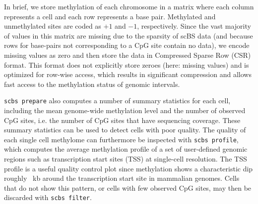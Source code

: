 \documentclass[twocolumn,10pt]{article}
\begin{document}
In brief, we store methylation of each chromosome in a matrix where each column represents a cell and each row represents a base pair.
Methylated and unmethylated sites are coded as $+1$ and $-1$, respectively.
Since the vast majority of values in this matrix are missing due to the sparsity of scBS data (and because rows for base-pairs not corresponding to a CpG site contain no data), we encode missing values as zero and then store the data in Compressed Sparse Row (CSR) format.
This format does not explicitly store zeroes (here: missing values) and is optimized for row-wise access, which results in significant compression and allows fast access to the methylation status of genomic intervals.

\texttt{scbs prepare} also computes a number of summary statistics for each cell, including the mean genome-wide methylation level and the number of observed CpG sites, i.e. the number of CpG sites that have sequencing coverage.
These summary statistics can be used to detect cells with poor quality.
The quality of each single cell methylome can furthermore be inspected with \texttt{scbs profile}, which computes the average methylation profile of a set of user-defined genomic regions such as transcription start sites (TSS) at single-cell resolution.
The TSS profile is a useful quality control plot since methylation shows a characteristic dip roughly ~kb around the transcription start site in mammalian genomes.
Cells that do not show this pattern, or cells with few observed CpG sites, may then be discarded with \texttt{scbs filter}.
\end{document}
